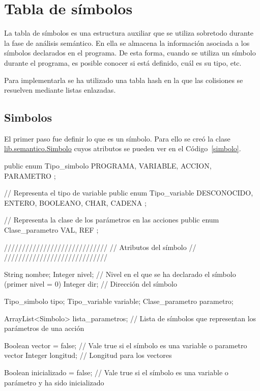 \section{Tabla de símbolos}
\label{tabla}

La tabla de símbolos es una estructura auxiliar que se utiliza sobretodo durante la fase de análisis semántico. En ella se almacena la información asociada a los símbolos declarados en el programa. De esta forma, cuando se utiliza un símbolo durante el programa, es posible conocer si está definido, cuál es su tipo, etc.

Para implementarla se ha utilizado una tabla hash en la que las colisiones se resuelven mediante listas enlazadas.

\subsection{Simbolos}
El primer paso fue definir lo que es un símbolo. Para ello se creó la clase \url{lib.semantico.Simbolo} cuyos atributos se pueden ver en el Código~\ref{simbolo}.

\begin{codigo}[style=java,caption={Atributos de la clase \url{lib.semantico.Simbolo}},label={simbolo}]
public enum Tipo_simbolo {
    PROGRAMA, VARIABLE, ACCION, PARAMETRO
};

// Representa el tipo de variable
public enum Tipo_variable {
    DESCONOCIDO, ENTERO, BOOLEANO, CHAR, CADENA
};

// Representa la clase de los parámetros en las acciones
public enum Clase_parametro {
    VAL, REF
};

/////////////////////////////
// Atributos del símbolo //
/////////////////////////////

String nombre;
Integer nivel; // Nivel en el que se ha declarado el símbolo (primer nivel = 0)
Integer dir; // Dirección del símbolo

Tipo_simbolo tipo;
Tipo_variable variable;
Clase_parametro parametro;

ArrayList<Simbolo> lista_parametros; // Lista de símbolos que representan los parámetros de una acción

Boolean vector = false; // Vale true si el símbolo es una variable o parametro vector
Integer longitud; // Longitud para los vectores

Boolean inicializado = false; // Vale true si el símbolo es una variable o parámetro y ha sido inicializado
\end{codigo}

